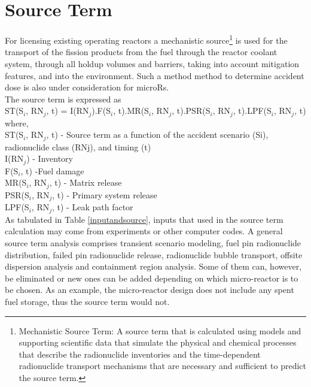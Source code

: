 \section{Source Term}
For licensing existing operating reactors a mechanistic source\footnote{Mechanistic Source Term: A source term that is calculated using models and supporting scientific data that simulate the physical and chemical processes that describe the radionuclide inventories and the time-dependent radionuclide transport mechanisms that are necessary and sufficient to predict the source term.}
 is used for the transport of the fission products from the fuel through the reactor coolant system, through all holdup volumes and barriers, taking into account mitigation features, and into the environment. Such a method method to determine accident dose is also under consideration for microRs.  \\
 
The source term is expressed as\\
ST(S$_{i}$, RN$_{j}$, t) = I(RN$_{j}$).F(S$_{i}$, t).MR(S$_{i}$, RN$_{j}$, t).PSR(S$_{i}$, RN$_{j}$, t).LPF(S$_{i}$, RN$_{j}$, t)\\
where,\\
ST(S$_{i}$, RN$_{j}$, t) - Source term as a function of the accident scenario (Si), radionuclide class (RNj), and timing (t)\\
I(RN$_{j}$) - Inventory \\
F(S$_{i}$, t) -Fuel damage\\
MR(S$_{i}$, RN$_{j}$, t) - Matrix release\\
PSR(S$_{i}$, RN$_{j}$, t) - Primary system release\\
LPF(S$_{i}$, RN$_{j}$, t) - Leak path factor\\

As tabulated in Table \ref{inputandsource}, inputs that used in the source term calculation may come from experiments or other computer codes. A general source term analysis comprises transient scenario modeling, fuel pin radionuclide distribution, failed pin radionuclide release, radionuclide bubble transport, offsite dispersion analysis and containment region analysis. Some of them can, however, be eliminated or new ones can be added depending on which micro-reactor is to be chosen. As an example, the micro-reactor design does not include any spent fuel storage, thus the source term would not. \\


